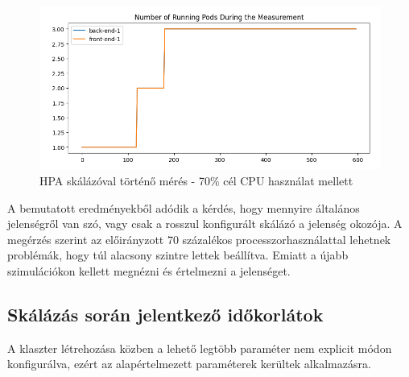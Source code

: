\begin{figure}[!ht]
	\centering
	\includegraphics[width=150mm, keepaspectratio]{figures/HPA-scaling-in-the-same-time.png}
	\caption{HPA skálázóval történő mérés - 70\% cél CPU használat mellett}
	\label{fig:HPA-scaling-same-time}
\end{figure}

A bemutatott eredményekből adódik a kérdés, hogy mennyire általános jelenségről van szó, vagy csak a rosszul konfigurált skálázó a jelenség okozója.
A megérzés szerint az előirányzott 70 százalékos processzorhasználattal lehetnek problémák, hogy túl alacsony szintre lettek beállítva.
Emiatt a újabb szimulációkon kellett megnézni és értelmezni a jelenséget. 

\subsection{Skálázás során jelentkező időkorlátok}
A klaszter létrehozása közben a lehető legtöbb paraméter nem explicit módon konfigurálva, ezért az alapértelmezett paraméterek kerültek alkalmazásra.
